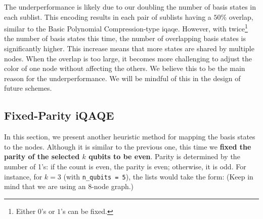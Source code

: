 The underperformance is likely due to our doubling the number of basis states in each sublist. This encoding results in each pair of sublists having a $50\%$ overlap, similar to the Basic Polynomial Compression-type \acrshort{iqaqe}. However, with twice\footnote{Either $0$'s or $1$'s can be fixed.} the number of basis states this time, the number of overlapping basis states is significantly higher. This increase means that more states are shared by multiple nodes. When the overlap is too large, it becomes more challenging to adjust the color of one node without affecting the others. We believe this to be the main reason for the underperformance. We will be mindful of this in the design of future schemes.







\subsection{Fixed-Parity iQAQE}
\label{subsection:Fixed-Parity_iQAQE}


In this section, we present another heuristic method for mapping the basis states to the nodes. Although it is similar to the previous one, this time we \textbf{fixed the parity of the selected $k$ qubits to be even}. Parity is determined by the number of 1's: if the count is even, the parity is even; otherwise, it is odd. For instance, for $k=3$ (with \texttt{n\_qubits = 5}), the lists would take the form: (Keep in mind that we are using an $8$-node graph.)


